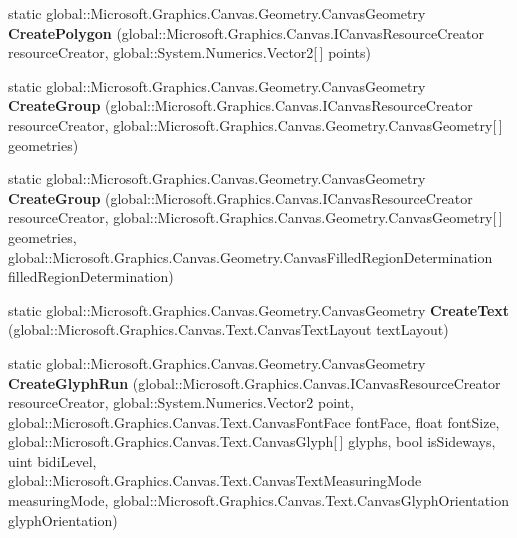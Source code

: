 \begin{DoxyCompactItemize}
static global\+::\+Microsoft.\+Graphics.\+Canvas.\+Geometry.\+Canvas\+Geometry {\bfseries Create\+Polygon} (global\+::\+Microsoft.\+Graphics.\+Canvas.\+I\+Canvas\+Resource\+Creator resource\+Creator, global\+::\+System.\+Numerics.\+Vector2\mbox{[}$\,$\mbox{]} points)
\item 
\mbox{\label{class_microsoft_1_1_graphics_1_1_canvas_1_1_geometry_1_1_canvas_geometry_a9905813ee5fbbed32289fa93a3ecaed8}} 
static global\+::\+Microsoft.\+Graphics.\+Canvas.\+Geometry.\+Canvas\+Geometry {\bfseries Create\+Group} (global\+::\+Microsoft.\+Graphics.\+Canvas.\+I\+Canvas\+Resource\+Creator resource\+Creator, global\+::\+Microsoft.\+Graphics.\+Canvas.\+Geometry.\+Canvas\+Geometry\mbox{[}$\,$\mbox{]} geometries)
\item 
\mbox{\label{class_microsoft_1_1_graphics_1_1_canvas_1_1_geometry_1_1_canvas_geometry_a1af065a42d2349de0898d7f63c2af94a}} 
static global\+::\+Microsoft.\+Graphics.\+Canvas.\+Geometry.\+Canvas\+Geometry {\bfseries Create\+Group} (global\+::\+Microsoft.\+Graphics.\+Canvas.\+I\+Canvas\+Resource\+Creator resource\+Creator, global\+::\+Microsoft.\+Graphics.\+Canvas.\+Geometry.\+Canvas\+Geometry\mbox{[}$\,$\mbox{]} geometries, global\+::\+Microsoft.\+Graphics.\+Canvas.\+Geometry.\+Canvas\+Filled\+Region\+Determination filled\+Region\+Determination)
\item 
\mbox{\label{class_microsoft_1_1_graphics_1_1_canvas_1_1_geometry_1_1_canvas_geometry_a5c956c37368cb565497e9e95f12918df}} 
static global\+::\+Microsoft.\+Graphics.\+Canvas.\+Geometry.\+Canvas\+Geometry {\bfseries Create\+Text} (global\+::\+Microsoft.\+Graphics.\+Canvas.\+Text.\+Canvas\+Text\+Layout text\+Layout)
\item 
\mbox{\label{class_microsoft_1_1_graphics_1_1_canvas_1_1_geometry_1_1_canvas_geometry_aac0a557b41812921ee04b4413f0fb8f1}} 
static global\+::\+Microsoft.\+Graphics.\+Canvas.\+Geometry.\+Canvas\+Geometry {\bfseries Create\+Glyph\+Run} (global\+::\+Microsoft.\+Graphics.\+Canvas.\+I\+Canvas\+Resource\+Creator resource\+Creator, global\+::\+System.\+Numerics.\+Vector2 point, global\+::\+Microsoft.\+Graphics.\+Canvas.\+Text.\+Canvas\+Font\+Face font\+Face, float font\+Size, global\+::\+Microsoft.\+Graphics.\+Canvas.\+Text.\+Canvas\+Glyph\mbox{[}$\,$\mbox{]} glyphs, bool is\+Sideways, uint bidi\+Level, global\+::\+Microsoft.\+Graphics.\+Canvas.\+Text.\+Canvas\+Text\+Measuring\+Mode measuring\+Mode, global\+::\+Microsoft.\+Graphics.\+Canvas.\+Text.\+Canvas\+Glyph\+Orientation glyph\+Orientation)

\end{DoxyCompactItemize}
